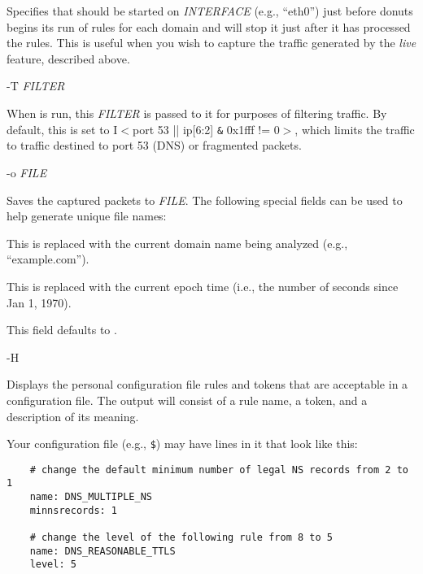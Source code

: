 \begin{description}
Specifies that  should be started on {\it INTERFACE} (e.g.,
``eth0'') just before donuts begins its run of rules for each domain
and will stop it just after it has processed the rules.  This is
useful when you wish to capture the traffic generated by the {\it live}
feature, described above.

\item -T {\it FILTER}\verb" "

When  is run, this {\it FILTER} is passed to it for purposes of
filtering traffic.  By default, this is set to I$<$port 53 || ip[6:2] \verb"&"
0x1fff != 0$>$, which limits the traffic to traffic destined to port 53
(DNS) or fragmented packets.

\item -o {\it FILE}\verb" "

Saves the  captured packets to {\it FILE}.  The following
special fields can be used to help generate unique file names:

\begin{description}

\item %

This is replaced with the current domain name being analyzed (e.g.,
``example.com'').

\item %

This is replaced with the current epoch time (i.e., the number of
seconds since Jan 1, 1970).

\end{description}

This field defaults to .

\item -H\verb" "

Displays the personal configuration file rules and tokens that are
acceptable in a configuration file.  The output will
consist of a rule name, a token, and a description of its meaning.

Your configuration file (e.g., \verb"$") may have lines in it
that look like this:

\begin{verbatim}
    # change the default minimum number of legal NS records from 2 to 1
    name: DNS_MULTIPLE_NS
    minnsrecords: 1

    # change the level of the following rule from 8 to 5
    name: DNS_REASONABLE_TTLS
    level: 5
\end{verbatim}


\end{description}
